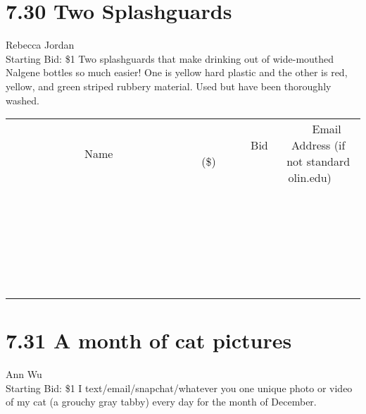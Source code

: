 \documentclass[11pt]{article}
\begin{document}
\section*{7.30 Two Splashguards}
Rebecca Jordan
\\
Starting Bid: \$1
\newline
Two splashguards that make drinking out of wide-mouthed Nalgene bottles so much easier! One is yellow hard plastic and the other is red, yellow, and green striped rubbery material. Used but have been thoroughly washed.
\\[6ex]
\begin{tabular}{c c c}
~~~~~~~~~~~~~Name~~~~~~~~~~~~~ & ~~~~~~~~~Bid (\$)~~~~~~~~~  & ~~~Email Address (if not standard olin.edu)~~~\\
 & & \\
\hline
 & & \\
\hline
 & & \\
\hline
 & & \\
\hline
 & & \\
\hline
 & & \\
\hline
 & & \\
\hline
 & & \\
\hline
 & & \\
\hline
 & & \\
\hline
 & & \\
\hline
 & & \\
\hline
 & & \\
\hline
 & & \\
\hline
 & & \\
\hline
 & & \\
\hline
 & & \\
\hline
 & & \\
\hline
 & & \\
\hline
 & & \\
\hline
 & & \\
\hline
 & & \\
\hline
 & & \\
\hline
 & & \\
\hline
 & & \\
\hline
 & & \\
\hline
\end{tabular}
\newpage
\section*{7.31 A month of cat pictures}
Ann Wu
\\
Starting Bid: \$1
\newline
I text/email/snapchat/whatever you one unique photo or video of my cat (a grouchy gray tabby) every day for the month of December.
\end{document}

